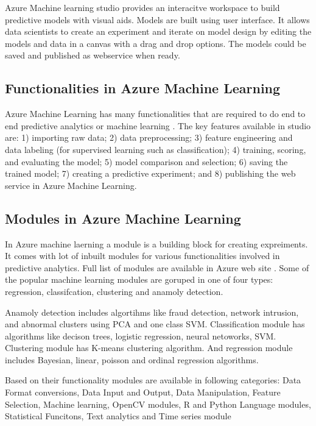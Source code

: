 \documentclass[9pt,twocolumn,twoside]{styles/osajnl}
\begin{document}
Azure Machine learning studio provides an interacitve workspace to
build predictive models with visual aids. Models are built using user
interface. It allows data scientists to create an experiment and
iterate on model design by editing the models and data in a canvas
with a drag and drop options.  The models could be saved and published
as webservice when ready. 

\subsection{Functionalities in Azure Machine Learning}

Azure Machine Learning has many functionalities that are required to
do end to end predictive analytics or machine
learning \cite{www-azureMLStudioCapabilities}. The key features
available in studio are: 1) importing raw data; 2) data preprocessing;
3) feature engineering and data labeling (for supervised learning such
as classification); 4) training, scoring, and evaluating the model; 5)
model comparison and selection; 6) saving the trained model; 7)
creating a predictive experiment; and 8) publishing the web service in
Azure Machine Learning.

\subsection{Modules in Azure Machine Learning}
In Azure machine laerning a module is a building block for creating
expreiments. It comes with lot of inbuilt modules for various
functionalities involved in predictive analytics. Full list of modules
are available in Azure web site \cite{www-azureMLModules}. Some of the
popular machine learning modules are goruped in one of four types:
regression, classifcation, clustering and anamoly detection.

Anamoly detection includes algortihms like fraud detection, network
intrusion, and abnormal clusters using PCA and one class
SVM. Classification module has algorithms like decison trees, logistic
regression, neural netoworks, SVM. Clustering module has K-means
clustering algorithm. And regression module includes Bayesian, linear,
poisson and ordinal regression algorithms.

Based on their functionality modules are available in following
categories: Data Format conversions, Data Input and Output, Data
Manipulation, Feature Selection, Machine learning, OpenCV modules, R
and Python Language modules, Statistical Funcitons, Text analytics and
Time series module \cite{www-azureMLModuleCategories}
\end{document}
